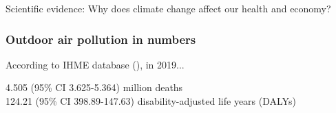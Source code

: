 \begin{frame}
\begin{center}
\Huge Scientific evidence: Why does \textcolor{mypurple}{climate change} affect our \textcolor{mygreen}{health} and \textcolor{mygreen}{economy}?
\end{center}
\end{frame}

\begin{frame}
\frametitle{Outdoor air pollution in numbers}
According to IHME database (\cite{ihme_gbd_2019}), in 2019...\vspace{1cm}
\begin{center}
    4.505 (95\% CI 3.625-5.364) million deaths\\\vspace{1cm}
    124.21 (95\% CI 398.89-147.63) disability-adjusted life years (DALYs)\\
\end{center}
\end{frame}


